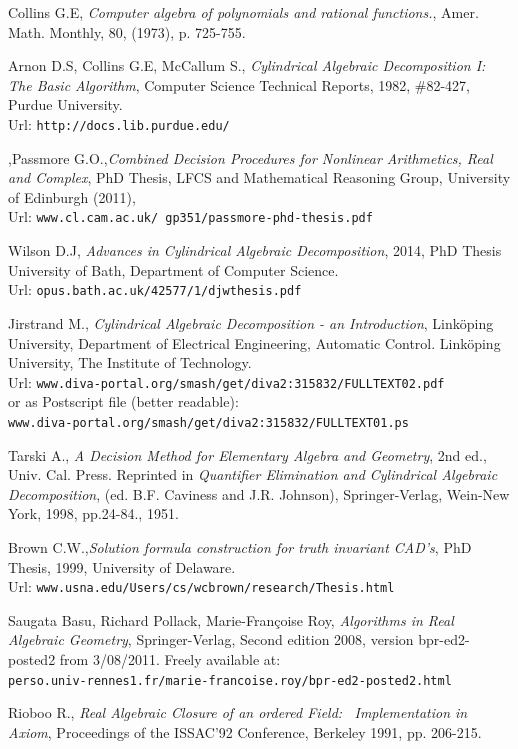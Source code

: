 \documentclass[12pt,a4paper]{article}
\begin{document}
\begin{thebibliography}{1}

 Collins G.E, {\em Computer algebra of polynomials and rational functions.}, Amer. Math. Monthly, 80, (1973), p. 725-755.

 Arnon D.S, Collins G.E, McCallum S., {\em Cylindrical Algebraic Decomposition I: The Basic Algorithm}, Computer Science Technical Reports,
1982, \#82-427, Purdue University. \\
Url: {\small {\tt http://docs.lib.purdue.edu/}} 
 
,Passmore G.O.,{\em Combined Decision Procedures for Nonlinear Arithmetics, Real and Complex}, PhD Thesis, LFCS and Mathematical Reasoning Group, University of Edinburgh (2011), \\
Url: {\small {\tt www.cl.cam.ac.uk/~gp351/passmore-phd-thesis.pdf}}

 Wilson D.J, {\em Advances in Cylindrical Algebraic Decomposition}, 2014, PhD Thesis University of Bath, Department of Computer Science. \\
Url: {\small {\tt opus.bath.ac.uk/42577/1/djwthesis.pdf}}
 
 Jirstrand M., {\em Cylindrical Algebraic Decomposition - an Introduction}, Linköping University, Department of Electrical Engineering, Automatic Control. Linköping University, The Institute of Technology. \\
Url:  
{\small {\tt www.diva-portal.org/smash/get/diva2:315832/FULLTEXT02.pdf}} \\
or as Postscript file (better readable): \\
{\small {\tt www.diva-portal.org/smash/get/diva2:315832/FULLTEXT01.ps}}

 Tarski A., {\em A Decision Method for Elementary Algebra and Geometry}, 2nd ed., Univ. Cal. Press. Reprinted in {\sl Quantifier Elimination
and Cylindrical Algebraic Decomposition}, (ed. B.F. Caviness and
J.R. Johnson), Springer-Verlag, Wein-New York, 1998, pp.24-84., 1951.

 Brown C.W.,{\em Solution formula construction for truth invariant CAD's}, PhD Thesis, 1999, University of Delaware. \\
Url: {\small {\tt www.usna.edu/Users/cs/wcbrown/research/Thesis.html}}


 Saugata Basu, Richard Pollack, Marie-Françoise Roy,
{\em Algorithms in Real Algebraic Geometry}, Springer-Verlag,
Second edition 2008, version bpr-ed2-posted2 from 3/08/2011. Freely
available at: \\
{\small {\tt perso.univ-rennes1.fr/marie-francoise.roy/bpr-ed2-posted2.html}}

 Rioboo R., {\em Real Algebraic Closure of an ordered Field:
\, Implementation in Axiom}, Proceedings of the ISSAC'92 Conference, Berkeley
1991, pp. 206-215.

   
\end{thebibliography}
%
\end{document}
